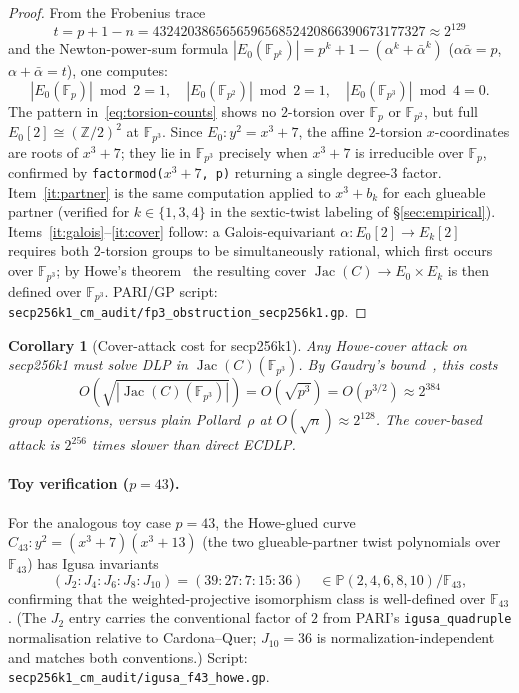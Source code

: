 \documentclass[11pt,a4paper]{article}
\newtheorem{corollary}[theorem]{Corollary}
\theoremstyle{definition}
\newcommand{\FF}{\mathbb{F}}
\newcommand{\ZZ}{\mathbb{Z}}
\newcommand{\Jac}{\operatorname{Jac}}
\begin{document}
\begin{proof}
From the Frobenius trace
\[
  t = p + 1 - n = 432420386565659656852420866390673177327 \approx 2^{129}
\]
and the Newton-power-sum formula
$|E_0(\FF_{p^k})| = p^k + 1 - (\alpha^k + \bar{\alpha}^k)$
($\alpha\bar{\alpha} = p$, $\alpha + \bar{\alpha} = t$), one computes:
\begin{equation}\label{eq:torsion-counts}
  |E_0(\FF_p)| \bmod 2 = 1, \quad
  |E_0(\FF_{p^2})| \bmod 2 = 1, \quad
  |E_0(\FF_{p^3})| \bmod 4 = 0.
\end{equation}
The pattern in~\eqref{eq:torsion-counts} shows no $2$-torsion over $\FF_p$ or
$\FF_{p^2}$, but full $E_0[2] \cong (\ZZ/2)^2$ at $\FF_{p^3}$.  Since
$E_0\colon y^2 = x^3 + 7$, the affine $2$-torsion $x$-coordinates are
roots of $x^3 + 7$; they lie in $\FF_{p^3}$ precisely when $x^3 + 7$
is irreducible over $\FF_p$, confirmed by
\texttt{factormod($x^3 + 7$,\,p)} returning a single degree-$3$ factor.
Item~\ref{it:partner} is the same computation applied to $x^3 + b_k$
for each glueable partner (verified for $k \in \{1, 3, 4\}$ in the
sextic-twist labeling of \S\ref{sec:empirical}).
Items~\ref{it:galois}--\ref{it:cover} follow: a Galois-equivariant
$\alpha\colon E_0[2] \to E_k[2]$ requires both $2$-torsion groups to
be simultaneously rational, which first occurs over $\FF_{p^3}$; by
Howe's theorem~\cite{howe1996} the resulting cover $\Jac(C) \to
E_0 \times E_k$ is then defined over $\FF_{p^3}$.
PARI/GP script: \texttt{secp256k1\_cm\_audit/fp3\_obstruction\_secp256k1.gp}.
\end{proof}

\begin{corollary}[Cover-attack cost for secp256k1]\label{cor:fp3cost}
Any Howe-cover attack on secp256k1 must solve DLP in
$\Jac(C)(\FF_{p^3})$.  By Gaudry's bound~\cite{gaudry2000}, this costs
\[
  O\!\left(\sqrt{|\Jac(C)(\FF_{p^3})|}\right)
  = O\!\left(\sqrt{p^3}\right)
  = O\!\left(p^{3/2}\right)
  \approx 2^{384}
\]
group operations, versus plain Pollard~$\rho$ at
$O(\sqrt{n}) \approx 2^{128}$.
The cover-based attack is $2^{256}$ times \emph{slower} than direct ECDLP.
\end{corollary}

\paragraph{Toy verification ($p = 43$).}
For the analogous toy case $p = 43$, the Howe-glued curve
$C_{43}\colon y^2 = (x^3 + 7)(x^3 + 13)$ (the two glueable-partner
twist polynomials over $\FF_{43}$) has Igusa invariants
\[
  (J_2 : J_4 : J_6 : J_8 : J_{10}) = (39 : 27 : 7 : 15 : 36)
  \quad \in \mathbb{P}(2,4,6,8,10)/\FF_{43},
\]
confirming that the weighted-projective isomorphism class is
well-defined over $\FF_{43}$.  (The $J_2$ entry carries the
conventional factor of $2$ from PARI's \texttt{igusa\_quadruple}
normalisation relative to Cardona--Quer; $J_{10} = 36$ is
normalization-independent and matches both conventions.)
Script: \texttt{secp256k1\_cm\_audit/igusa\_f43\_howe.gp}.
\end{document}
